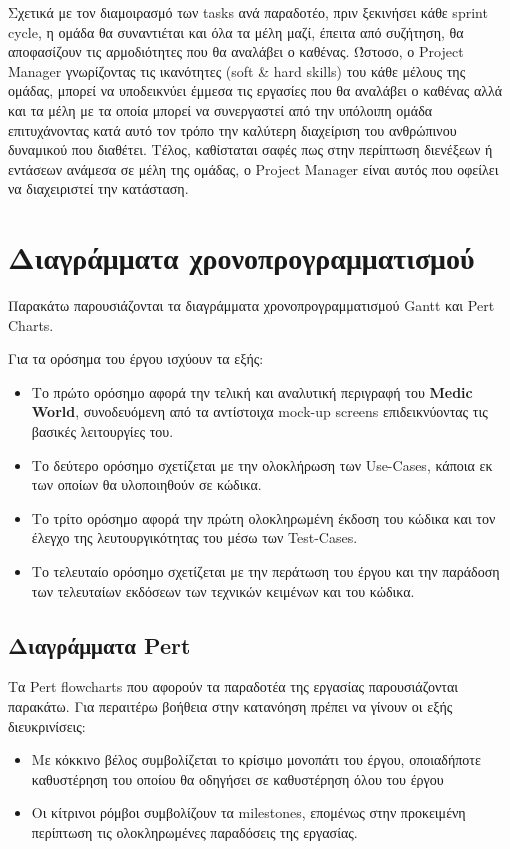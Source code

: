 \documentclass{article}
\begin{document}
Σχετικά με τον διαμοιρασμό των tasks ανά παραδοτέο, πριν ξεκινήσει κάθε sprint cycle, η ομάδα θα συναντιέται και όλα τα μέλη μαζί, έπειτα από συζήτηση, θα αποφασίζουν τις αρμοδιότητες που θα αναλάβει ο καθένας. Ώστοσο, ο Project Manager γνωρίζοντας τις ικανότητες (soft \& hard skills) του κάθε μέλους της ομάδας, μπορεί να υποδεικνύει έμμεσα τις εργασίες που θα αναλάβει ο καθένας αλλά και τα μέλη με τα οποία μπορεί να συνεργαστεί από την υπόλοιπη ομάδα επιτυχάνοντας κατά αυτό τον τρόπο την καλύτερη διαχείριση του ανθρώπινου δυναμικού που διαθέτει. Τέλος, καθίσταται σαφές πως στην περίπτωση διενέξεων ή εντάσεων ανάμεσα σε μέλη της ομάδας, ο Project Manager είναι αυτός που οφείλει να διαχειριστεί την κατάσταση.

\section{Διαγράμματα χρονοπρογραμματισμού}

Παρακάτω παρουσιάζονται τα διαγράμματα χρονοπρογραμματισμού Gantt και Pert Charts.

Για τα ορόσημα του έργου ισχύουν τα εξής:
\begin{itemize}
    \item Το πρώτο ορόσημο αφορά την τελική και αναλυτική περιγραφή του \textbf{Medic World}, συνοδευόμενη από τα αντίστοιχα mock-up screens επιδεικνύοντας τις βασικές λειτουργίες του.
    \item Το δεύτερο ορόσημο σχετίζεται με την ολοκλήρωση των Use-Cases, κάποια εκ των οποίων θα υλοποιηθούν σε κώδικα.
    \item Το τρίτο ορόσημο αφορά την πρώτη ολοκληρωμένη έκδοση του κώδικα και τον έλεγχο της λευτουργικότητας του μέσω των Test-Cases.
    \item Το τελευταίο ορόσημο σχετίζεται με την περάτωση του έργου και την παράδοση των τελευταίων εκδόσεων των τεχνικών κειμένων και του κώδικα. 
\end{itemize}

\subsection{Διαγράμματα Pert}

Τα Pert flowcharts που αφορούν τα παραδοτέα της εργασίας παρουσιάζονται παρακάτω. Για περαιτέρω βοήθεια στην κατανόηση πρέπει να γίνουν οι εξής διευκρινίσεις:

\begin{itemize}
  \item Με κόκκινο βέλος συμβολίζεται το κρίσιμο μονοπάτι του έργου, οποιαδήποτε καθυστέρηση του οποίου θα οδηγήσει σε καθυστέρηση όλου του έργου
  \item Οι κίτρινοι ρόμβοι συμβολίζουν τα milestones, επομένως στην προκειμένη περίπτωση τις ολοκληρωμένες παραδόσεις της εργασίας.
\end{itemize}
\end{document}
